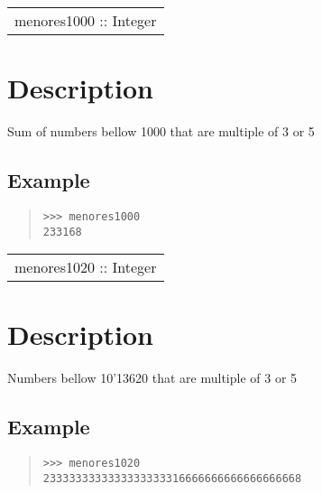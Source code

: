 \begin{haddockdesc}
\item[\begin{tabular}{@{}l}
menores1000 :: Integer
\end{tabular}]
{\haddockbegindoc
\section*{Description}
Sum of numbers bellow 1000 that are multiple of 3 or 5\par
\subsection*{Example}
\begin{quote}
{\haddockverb\begin{verbatim}
>>> menores1000
233168

\end{verbatim}}
\end{quote}}
\end{haddockdesc}
\begin{haddockdesc}
\item[\begin{tabular}{@{}l}
menores1020 :: Integer
\end{tabular}]
{\haddockbegindoc
\section*{Description}
Numbers bellow 10{\char '136}20 that are multiple of 3 or 5\par
\subsection*{Example}
\begin{quote}
{\haddockverb\begin{verbatim}
>>> menores1020
2333333333333333333316666666666666666668

\end{verbatim}}
\end{quote}}
\end{haddockdesc}
